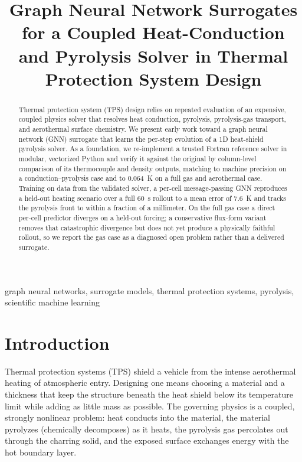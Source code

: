 \documentclass[conference]{IEEEtran}
\begin{document}
\title{Graph Neural Network Surrogates for a Coupled Heat-Conduction and
Pyrolysis Solver in Thermal Protection System Design}

\author{
}

\maketitle

\begin{abstract}
Thermal protection system (TPS) design relies on repeated evaluation of an
expensive, coupled physics solver that resolves heat conduction, pyrolysis,
pyrolysis-gas transport, and aerothermal surface chemistry. We present early work
toward a graph neural network (GNN) surrogate that learns the per-step evolution
of a 1D heat-shield pyrolysis solver. As a foundation, we re-implement a trusted
Fortran reference solver in modular, vectorized Python and verify it against the
original by column-level comparison of its thermocouple and density outputs,
matching to machine precision on a conduction--pyrolysis case and to 0.064~K on a
full gas and aerothermal case. Training on data from the validated solver, a
per-cell message-passing GNN reproduces a held-out heating scenario over a full
60~s rollout to a mean error of 7.6~K and tracks the pyrolysis front to within a
fraction of a millimeter. On the full gas case a direct per-cell predictor
diverges on a held-out forcing; a conservative flux-form variant removes that
catastrophic divergence but does not yet produce a physically faithful rollout, so
we report the gas case as a diagnosed open problem rather than a delivered
surrogate.
\end{abstract}

\begin{IEEEkeywords}
graph neural networks, surrogate models, thermal protection systems, pyrolysis,
scientific machine learning
\end{IEEEkeywords}

\section{Introduction}
Thermal protection systems (TPS) shield a vehicle from the intense aerothermal
heating of atmospheric entry. Designing one means choosing a material and a
thickness that keep the structure beneath the heat shield below its temperature
limit while adding as little mass as possible. The governing physics is a coupled,
strongly nonlinear problem: heat conducts into the material, the material
pyrolyzes (chemically decomposes) as it heats, the pyrolysis gas percolates out
through the charring solid, and the exposed surface exchanges energy with the hot
boundary layer.
\end{document}
